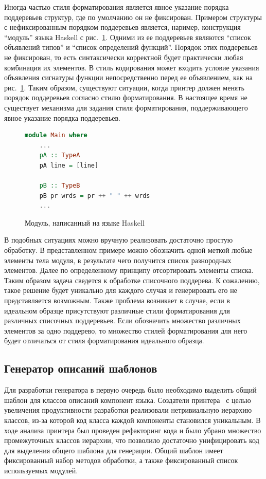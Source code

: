 Иногда частью стиля форматирования является явное указание порядка поддеревьев структур, где по умолчанию он не фиксирован. Примером структуры с нефиксированным порядком поддеревьев является, наример, конструкция ``модуль'' языка Haskell с рис.~\ref{haskellModule}. Одними из ее поддеревьев являются ``список объявлений типов'' и ``список определений функций''. Порядок этих поддеревьев не фиксирован, то есть синтаксически корректной будет практически любая комбинация их элементов. В стиль кодирования может входить условие указания объявления сигнатуры функции непосредственно перед ее объявлением, как на рис.~\ref{haskellModule}. Таким образом, существуют ситуации, когда принтер должен менять порядок поддеревьев согласно стилю форматирования. В настоящее время не существует механизма для задания стиля форматирования, поддерживающего явное указание порядка поддеревьев.  

\begin{figure}[H]
    \begin{lstlisting}[language=Haskell]
    module Main where
    ...
    pA :: TypeA
    pA line = [line]
    
    pB :: TypeB
    pB pr wrds = pr ++ " " ++ wrds
    ...
    \end{lstlisting}
\caption{Модуль, написанный на языке Haskell}    
\label{haskellModule}
\end{figure}


В подобных ситуациях можно вручную реализовать достаточно простую обработку. В представленном примере можно обозначить одной меткой любые элементы тела модуля, в результате чего получится список разнородных элементов. Далее по определенному принципу отсортировать элементы списка. Таким образом задача сведется к обработке списочного поддерева. К сожалению, такое решение будет уникально для каждого случая и генерировать его не представляется возможным. Также проблема возникает в случае, если в идеальном образце присутствуют различные стили форматирования для различных списочных поддеревьев. Если обозначить множество различных элементов за одно поддерево, то множество стилей форматирования для него будет отличаться от стиля форматирования идеального образца.

\subsection{Генератор описаний шаблонов}

Для разработки генератора в первую очередь было необходимо выделить общий шаблон для классов описаний компонент языка. Создатели принтера~\cite{podkopaev:diploma} с целью увеличения продуктивности разработки реализовали нетривиальную иерархию классов, из-за которой код класса каждой компоненты становился уникальным. В ходе анализа принтера был проведен рефакторинг кода и было убрано множество промежуточных классов иерархии, что позволило достаточно унифицировать код для выделения общего шаблона для генерации. Общий шаблон имеет фиксированный набор методов обработки, а также фиксированный список используемых модулей.

